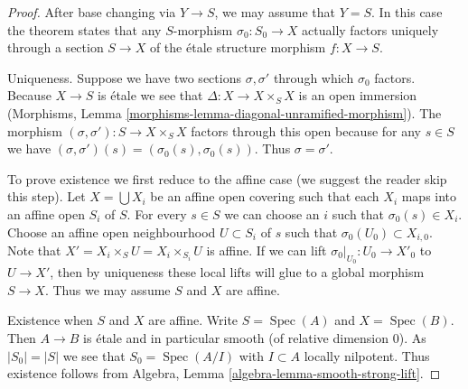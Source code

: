 \documentclass[10pt,a4paper]{amsart}
\theoremstyle{plain}
\theoremstyle{definition}
\theoremstyle{remark}
\numberwithin{equation}{subsection}
\def\Spec{\mathop{\mathrm{Spec}}}
\begin{document}
\begin{proof}
After base changing via $Y \to S$, we may assume that $Y = S$.
In this case the theorem states that any $S$-morphism $\sigma_0 : S_0 \to X$
actually factors uniquely through a section $S \to X$ of the
\'etale structure morphism $f : X \to S$.

\medskip\noindent
Uniqueness. Suppose we have two sections $\sigma, \sigma'$
through which $\sigma_0$ factors. Because $X \to S$ is \'etale
we see that $\Delta : X \to X \times_S X$ is an open immersion
(Morphisms, Lemma \ref{morphisms-lemma-diagonal-unramified-morphism}).
The morphism $(\sigma, \sigma') : S \to X \times_S X$ factors
through this open because for any $s \in S$ we have
$(\sigma, \sigma')(s) = (\sigma_0(s), \sigma_0(s))$. Thus
$\sigma = \sigma'$.

\medskip\noindent
To prove existence we first reduce to the affine case
(we suggest the reader skip this step).
Let $X = \bigcup X_i$ be an affine open covering such
that each $X_i$ maps into an affine open $S_i$ of $S$.
For every $s \in S$ we can choose an $i$ such that
$\sigma_0(s) \in X_i$.
Choose an affine open neighbourhood $U \subset S_i$ of $s$
such that $\sigma_0(U_0) \subset X_{i, 0}$. Note that
$X' = X_i \times_S U = X_i \times_{S_i} U$ is affine.
If we can lift $\sigma_0|_{U_0} : U_0 \to X'_0$ to
$U \to X'$, then by uniqueness these local lifts will glue
to a global morphism $S \to X$. Thus we may assume $S$ and
$X$ are affine.

\medskip\noindent
Existence when $S$ and $X$ are affine. Write $S = \Spec(A)$
and $X = \Spec(B)$. Then $A \to B$ is \'etale and in particular
smooth (of relative dimension $0$). As $|S_0| = |S|$ we see
that $S_0 = \Spec(A/I)$ with $I \subset A$ locally nilpotent.
Thus existence follows from
Algebra, Lemma \ref{algebra-lemma-smooth-strong-lift}.
\end{proof}
\end{document}
